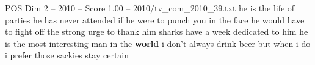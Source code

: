 \begin{textsample}{POS Dim 2 – 2010 – Score 1.00 – 2010/tv\_com\_2010\_39.txt}  \label{ex:f2_pos_047}
he is the life of parties he has never attended if he were to punch you in the face he would have to fight off the strong urge to thank him sharks have a week dedicated to him he is the most interesting man in the \textbf{world} i don't always drink beer but when i do i prefer those sackies stay certain

\end{textsample}
